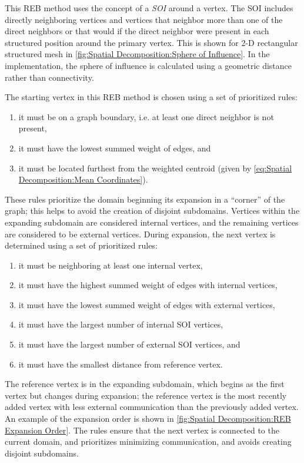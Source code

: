 {{{{        This \ac{REB} method uses the concept of a \emph{\ac{SOI}} around a vertex.
        The \ac{SOI} includes directly neighboring vertices and vertices that neighbor more than one of the direct neighbors or that would if the direct neighbor were present in each structured position around the primary vertex.
        This is shown for 2-D rectangular structured mesh in \cref{fig:Spatial Decomposition:Sphere of Influence}.
        In the implementation, the sphere of influence is calculated using a geometric distance rather than connectivity.

        The starting vertex in this \ac{REB} method is chosen using a set of prioritized rules:
        \begin{enumerate}
            \item{it must be on a graph boundary, i.e. at least one direct neighbor is not present,}
            \item{it must have the lowest summed weight of edges, and}
            \item{it must be located furthest from the weighted centroid (given by \cref{eq:Spatial Decomposition:Mean Coordinates}).}
        \end{enumerate}
        These rules prioritize the domain beginning its expansion in a ``corner'' of the graph; this helps to avoid the creation of disjoint subdomains.
        Vertices within the expanding subdomain are considered internal vertices, and the remaining vertices are considered to be external vertices.
        During expansion, the next vertex is determined using a set of prioritized rules:
        \begin{enumerate}
            \item{it must be neighboring at least one internal vertex,}
            \item{it must have the highest summed weight of edges with internal vertices,}
            \item{it must have the lowest summed weight of edges with external vertices,}
            \item{it must have the largest number of internal SOI vertices,}
            \item{it must have the largest number of external SOI vertices, and}
            \item{it must have the smallest distance from reference vertex.}
        \end{enumerate}
        The reference vertex is in the expanding subdomain, which begins as the first vertex but changes during expansion; the reference vertex is the most recently added vertex with less external communication than the previously added vertex.
        An example of the expansion order is shown in \cref{fig:Spatial Decomposition:REB Expansion Order}.
        The rules ensure that the next vertex is connected to the current domain, and prioritizes minimizing communication, and avoids creating disjoint subdomains.

}}}}
